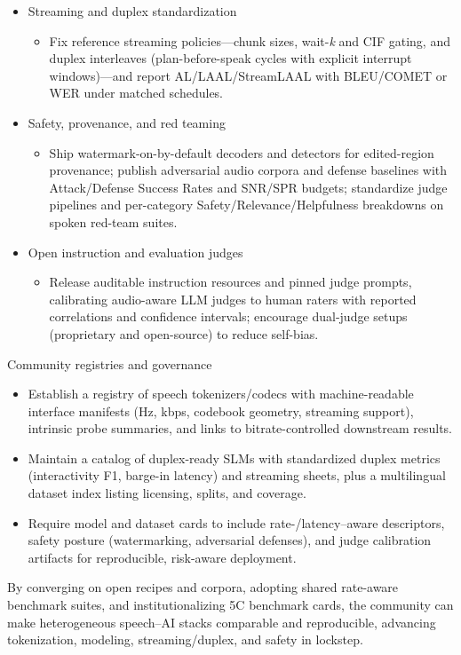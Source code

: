 \begin{itemize}
  \item Streaming and duplex standardization
  \begin{itemize}
    \item Fix reference streaming policies—chunk sizes, wait-\emph{k} and CIF gating, and duplex interleaves (plan-before-speak cycles with explicit interrupt windows)—and report AL/LAAL/StreamLAAL with BLEU/COMET or WER under matched schedules.
  \end{itemize}

  \item Safety, provenance, and red teaming
  \begin{itemize}
    \item Ship watermark-on-by-default decoders and detectors for edited-region provenance; publish adversarial audio corpora and defense baselines with Attack/Defense Success Rates and SNR/SPR budgets; standardize judge pipelines and per-category Safety/Relevance/Helpfulness breakdowns on spoken red-team suites.
  \end{itemize}

  \item Open instruction and evaluation judges
  \begin{itemize}
    \item Release auditable instruction resources and pinned judge prompts, calibrating audio-aware LLM judges to human raters with reported correlations and confidence intervals; encourage dual-judge setups (proprietary and open-source) to reduce self-bias.
  \end{itemize}

\end{itemize}

Community registries and governance

\begin{itemize}
  \item Establish a registry of speech tokenizers/codecs with machine-readable interface manifests (Hz, kbps, codebook geometry, streaming support), intrinsic probe summaries, and links to bitrate-controlled downstream results.
  \item Maintain a catalog of duplex-ready SLMs with standardized duplex metrics (interactivity F1, barge-in latency) and streaming sheets, plus a multilingual dataset index listing licensing, splits, and coverage.
  \item Require model and dataset cards to include rate-/latency–aware descriptors, safety posture (watermarking, adversarial defenses), and judge calibration artifacts for reproducible, risk-aware deployment.
\end{itemize}

By converging on open recipes and corpora, adopting shared rate-aware benchmark suites, and institutionalizing 5C benchmark cards, the community can make heterogeneous speech–AI stacks comparable and reproducible, advancing tokenization, modeling, streaming/duplex, and safety in lockstep.
